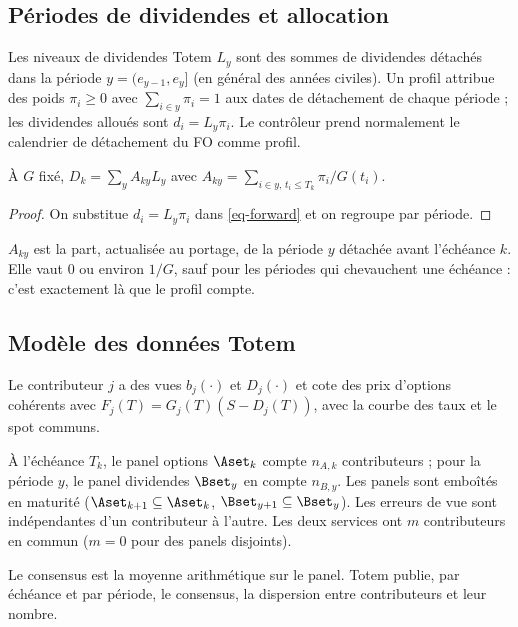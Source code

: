 \subsection{Périodes de dividendes et allocation}
\begin{definition}[Allocation]\label{def-allocation}
Les niveaux de dividendes Totem $L_y$ sont des sommes de dividendes détachés dans la période $y=(e_{y-1},e_y]$
(en général des années civiles). Un profil attribue des poids $\pi_i\ge0$ avec $\sum_{i\in y}\pi_i=1$ aux dates de
détachement de chaque période ; les dividendes alloués sont $d_i=L_y\pi_i$. Le contrôleur prend normalement le
calendrier de détachement du FO comme profil.
\end{definition}

\begin{lemma}\label{lem-allocation}
À $G$ fixé, $D_k=\sum_yA_{ky}L_y$ avec $A_{ky}=\sum_{i\in y,\,t_i\le T_k}\pi_i/G(t_i)$.
\end{lemma}
\begin{proof}
On substitue $d_i=L_y\pi_i$ dans \cref{eq-forward} et on regroupe par période.
\end{proof}
$A_{ky}$ est la part, actualisée au portage, de la période $y$ détachée avant l'échéance $k$. Elle vaut $0$ ou
environ $1/G$, sauf pour les périodes qui chevauchent une échéance : c'est exactement là que le profil compte.

\subsection{Modèle des données Totem}
\begin{assumption}\label{ass-consistent}
Le contributeur $j$ a des vues $b_j(\cdot)$ et $D_j(\cdot)$ et cote des prix d'options cohérents avec
$F_j(T)=G_j(T)(S-D_j(T))$, avec la courbe des taux et le spot communs.
\end{assumption}
\begin{assumption}[Panels]\label{ass-panels}
À l'échéance $T_k$, le panel options $\Aset_k$ compte $n_{A,k}$ contributeurs ; pour la période $y$, le panel
dividendes $\Bset_y$ en compte $n_{B,y}$. Les panels sont emboîtés en maturité ($\Aset_{k+1}\subseteq\Aset_k$,
$\Bset_{y+1}\subseteq\Bset_y$). Les erreurs de vue sont indépendantes d'un contributeur à l'autre. Les deux services ont
$m$ contributeurs en commun ($m=0$ pour des panels disjoints).
\end{assumption}
\begin{assumption}[Consensus]\label{ass-consensus}
Le consensus est la moyenne arithmétique sur le panel. Totem publie, par échéance et par période, le consensus, la
dispersion entre contributeurs et leur nombre.
\end{assumption}

